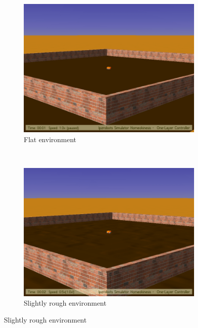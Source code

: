\documentclass[msc,ai,logo]{infthesis}
\begin{document}
\begin{figure}[H]
        \centering
        \begin{subfigure}[b]{0.45\textwidth}
                \centering
                \includegraphics[width=\textwidth]{env00.jpg}
                \caption{Flat environment}
                \label{fig:flat}
        \end{subfigure}%
        ~ %
        \begin{subfigure}[b]{0.45\textwidth}
                \centering
                \includegraphics[width=\textwidth]{env05.jpg}
                \caption{Slightly rough environment}

\end{subfigure}
\end{figure}
\end{document}
